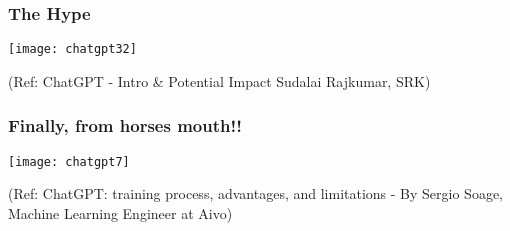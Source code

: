 \begin{frame}[fragile]\frametitle{The Hype}


\begin{center}
\texttt{[image: chatgpt32]}
\end{center}		

{\tiny (Ref: ChatGPT - Intro \& Potential Impact Sudalai Rajkumar, SRK)}
			

\end{frame}



\begin{frame}[fragile]\frametitle{Finally, from horses mouth!!}


\begin{center}
\texttt{[image: chatgpt7]}
\end{center}		

{\tiny (Ref: ChatGPT: training process, advantages, and limitations - By Sergio Soage, Machine Learning Engineer at Aivo)}
			

\end{frame}





			



